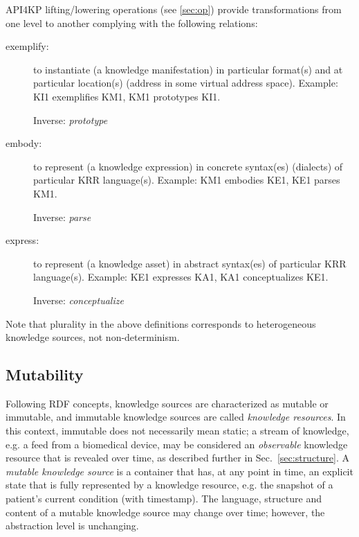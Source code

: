 \documentclass[runningheads]{llncs}
\begin{document}
API4KP lifting/lowering operations (see \ref{sec:op}) provide transformations from one level to another complying with the following relations:
\begin{description}
\item[exemplify:] to instantiate (a knowledge manifestation) in particular format(s) and at particular location(s) (address in some virtual address space). Example: KI1 exemplifies KM1, KM1 prototypes KI1.

Inverse: \emph{prototype}
\item[embody:] to represent (a knowledge expression) in concrete syntax(es) (dialects) of particular KRR language(s). Example: KM1 embodies KE1, KE1 parses KM1.

Inverse: \emph{parse}
\item[express:] to represent (a knowledge asset) in abstract syntax(es) of particular KRR language(s). Example: KE1 expresses KA1, KA1 conceptualizes KE1.

Inverse: \emph{conceptualize}
\end{description}
Note that plurality in the above definitions corresponds to heterogeneous knowledge sources, not non-determinism.

\vspace{-0.3cm}
\subsection{Mutability}
Following RDF concepts\cite{RDF2014}, knowledge sources are characterized as mutable or immutable, and immutable knowledge sources are called \emph{knowledge resources}. In this context, immutable does not necessarily mean static;  a stream of knowledge, e.g. a feed from a biomedical device, may be considered an \emph{observable} knowledge resource that is revealed over time, as described further in Sec.~\ref{sec:structure}.
A \emph{mutable knowledge source} is a container that has, at any point in time, an explicit state that is fully represented by a knowledge resource, e.g. the snapshot of a patient's current condition (with timestamp). The language, structure and content of a mutable knowledge source may change over time; however, the abstraction level is unchanging. 
\end{document}
